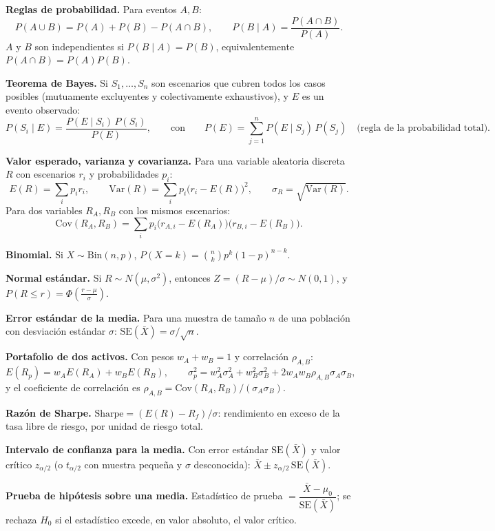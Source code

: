 \documentclass[11pt,a4paper,oneside]{article}
\theoremstyle{definition}
\begin{document}
\begin{summaryBox}
\textbf{Reglas de probabilidad.} Para eventos $A,B$:
\[
P(A\cup B) = P(A)+P(B)-P(A\cap B), \qquad P(B\mid A) = \frac{P(A\cap B)}{P(A)}.
\]
$A$ y $B$ son independientes si $P(B\mid A)=P(B)$, equivalentemente
$P(A\cap B)=P(A)P(B)$.

\textbf{Teorema de Bayes.} Si $S_1,\dots,S_n$ son escenarios que cubren
todos los casos posibles (mutuamente excluyentes y colectivamente
exhaustivos), y $E$ es un evento observado:
\[
P(S_i\mid E) = \frac{P(E\mid S_i)\,P(S_i)}{P(E)}, \qquad\text{con}\qquad
P(E)=\sum_{j=1}^nP(E\mid S_j)\,P(S_j)\quad\text{(regla de la probabilidad total).}
\]

\textbf{Valor esperado, varianza y covarianza.} Para una variable aleatoria
discreta $R$ con escenarios $r_i$ y probabilidades $p_i$:
\[
E(R)=\sum_ip_ir_i, \qquad \mathrm{Var}(R)=\sum_ip_i\big(r_i-E(R)\big)^2, \qquad \sigma_R=\sqrt{\mathrm{Var}(R)}.
\]
Para dos variables $R_A,R_B$ con los mismos escenarios:
\[
\mathrm{Cov}(R_A,R_B)=\sum_ip_i\big(r_{A,i}-E(R_A)\big)\big(r_{B,i}-E(R_B)\big).
\]

\textbf{Binomial.} Si $X\sim\mathrm{Bin}(n,p)$, $P(X=k)=\binom{n}{k}p^k(1-p)^{n-k}$.

\textbf{Normal estándar.} Si $R\sim N(\mu,\sigma^2)$, entonces
$Z=(R-\mu)/\sigma\sim N(0,1)$, y $P(R\le r)=\Phi\!\left(\frac{r-\mu}{\sigma}\right)$.

\textbf{Error estándar de la media.} Para una muestra de tamaño $n$ de una
población con desviación estándar $\sigma$:
$\mathrm{SE}(\bar X)=\sigma/\sqrt{n}$.

\textbf{Portafolio de dos activos.} Con pesos $w_A+w_B=1$ y correlación
$\rho_{A,B}$:
\[
E(R_p)=w_AE(R_A)+w_BE(R_B), \qquad
\sigma_p^2=w_A^2\sigma_A^2+w_B^2\sigma_B^2+2w_Aw_B\rho_{A,B}\sigma_A\sigma_B,
\]
y el coeficiente de correlación es $\rho_{A,B}=\mathrm{Cov}(R_A,R_B)/(\sigma_A\sigma_B)$.

\textbf{Razón de Sharpe.} $\mathrm{Sharpe}=(E(R)-R_f)/\sigma$: rendimiento
en exceso de la tasa libre de riesgo, por unidad de riesgo total.

\textbf{Intervalo de confianza para la media.} Con error estándar
$\mathrm{SE}(\bar X)$ y valor crítico $z_{\alpha/2}$ (o $t_{\alpha/2}$ con
muestra pequeña y $\sigma$ desconocida):
$\bar X\pm z_{\alpha/2}\,\mathrm{SE}(\bar X)$.

\textbf{Prueba de hipótesis sobre una media.} Estadístico de prueba
$=\dfrac{\bar X-\mu_0}{\mathrm{SE}(\bar X)}$; se rechaza $H_0$ si el
estadístico excede, en valor absoluto, el valor crítico.
\end{summaryBox}
\end{document}

